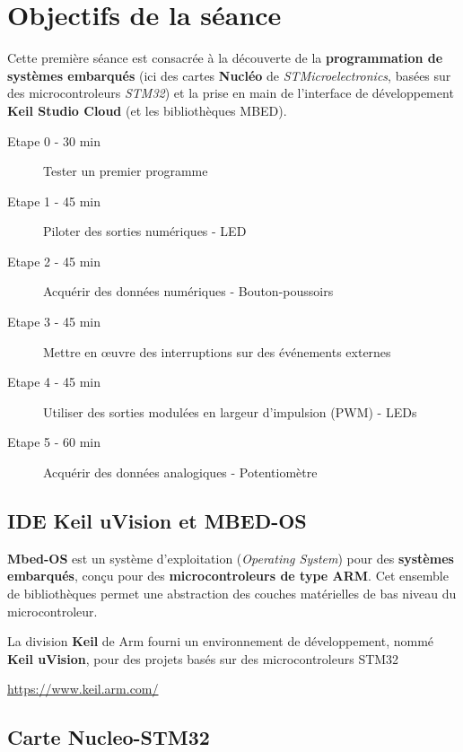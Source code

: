 \documentclass[a4paper,11pt,titlepage]{article} %
\begin{document}
\section{Objectifs de la séance}

Cette première séance est consacrée à la découverte de la \textbf{programmation de systèmes embarqués} (ici des cartes \textbf{Nucléo} de \textit{STMicroelectronics}, basées sur des microcontroleurs \textit{STM32}) et la prise en main de l'interface de développement \textbf{Keil Studio Cloud} (et les bibliothèques MBED).


	\begin{description}
		\item[Etape 0 - 30 min] Tester un premier programme
		\item[Etape 1 - 45 min] Piloter des sorties numériques - LED
		\item[Etape 2 - 45 min] Acquérir des données numériques - Bouton-poussoirs
		\item[Etape 3 - 45 min] Mettre en \oe{}uvre des interruptions sur des événements externes
		\item[Etape 4 - 45 min] Utiliser des sorties modulées en largeur d'impulsion (PWM) - LEDs
		\item[Etape 5 - 60 min] Acquérir des données analogiques - Potentiomètre
	\end{description}	


\subsection{IDE Keil uVision et MBED-OS}

\textbf{Mbed-OS} est un système d'exploitation (\textit{Operating System}) pour des \textbf{systèmes embarqués}, conçu pour des \textbf{microcontroleurs de type ARM}. Cet ensemble de bibliothèques permet une abstraction des couches matérielles de bas niveau du microcontroleur. 

La division \textbf{Keil} de Arm fourni un environnement de développement, nommé \textbf{Keil uVision}, pour des projets basés sur des microcontroleurs STM32

\href{https://www.keil.arm.com/}{https://www.keil.arm.com/}


\subsection{Carte Nucleo-STM32}
\end{document}
